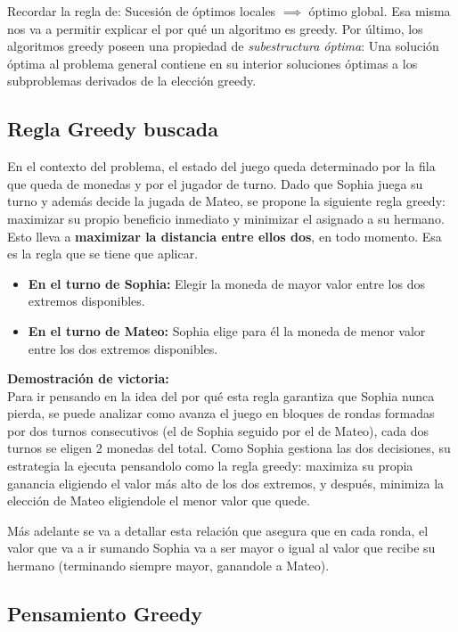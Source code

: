 Recordar la regla de: Sucesión de óptimos locales $\implies$
 óptimo global. Esa misma nos va a permitir explicar el por qué un algoritmo es greedy. 
Por último, los algoritmos greedy poseen una propiedad de \textit{subestructura óptima}: Una solución óptima al problema general contiene en su interior soluciones óptimas a los subproblemas derivados de la elección greedy.

\subsection{Regla Greedy buscada}

En el contexto del problema, el estado del juego queda determinado por la fila que queda de monedas y por el jugador de turno. Dado que Sophia juega su turno y además decide la jugada de Mateo, se propone la siguiente regla greedy: maximizar su propio beneficio inmediato y minimizar el asignado a su hermano. Esto lleva a \textbf{maximizar la distancia entre ellos dos}, en todo momento. Esa es la regla que se tiene que aplicar.
\begin{itemize}
    \item \textbf{En el turno de Sophia:} Elegir la moneda de mayor valor entre los dos extremos disponibles.
    \item \textbf{En el turno de Mateo:} Sophia elige para él la moneda de menor valor entre los dos extremos disponibles.
\end{itemize}

\noindent\textbf{Demostración de victoria:} \\
Para ir pensando en la idea del por qué esta regla garantiza que Sophia nunca pierda, se puede analizar como avanza el juego en bloques de rondas formadas por dos turnos consecutivos (el de Sophia seguido por el de Mateo), cada dos turnos se eligen 2 monedas del total. 
Como Sophia gestiona las dos decisiones, su estrategia la ejecuta pensandolo como la regla greedy: maximiza su propia ganancia eligiendo el valor más alto de los dos extremos, y después, minimiza la elección de Mateo eligiendole el menor valor que quede.

Más adelante se va a detallar esta relación que asegura que en cada ronda, el valor que va a ir sumando Sophia va a ser mayor o igual al valor que recibe su hermano (terminando siempre mayor, ganandole a Mateo). 

\subsection{Pensamiento Greedy}

